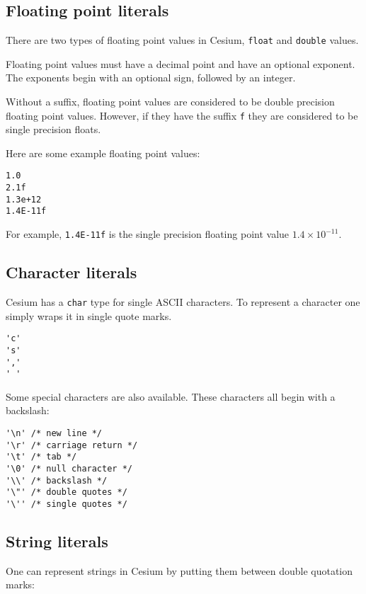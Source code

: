 \documentclass[a4paper,10pt]{article}
\newcommand{\code}{\lstinline}
\begin{document}
\subsection{Floating point literals}

There are two types of floating point values in Cesium, \code{float} and \code{double} values.

Floating point values must have a decimal point and have an optional exponent. The exponents 
begin with an optional sign, followed by an integer. 

Without a suffix, floating point values are considered to be double precision floating point 
values. However, if they have the suffix \code{f} they are considered to be single precision 
floats.

Here are some example floating point values:

\begin{lstlisting}
1.0
2.1f
1.3e+12
1.4E-11f
\end{lstlisting}

For example, \code{1.4E-11f} is the single precision floating point value $1.4\times 10^{-11}$.

\subsection{Character literals}

Cesium has a \code{char} type for single ASCII characters. To represent a character one simply
wraps it in single quote marks.

\begin{lstlisting}
'c'
's'
','
' '
\end{lstlisting}

Some special characters are also available. These characters all begin with a backslash:

\begin{lstlisting}
'\n' /* new line */
'\r' /* carriage return */
'\t' /* tab */
'\0' /* null character */
'\\' /* backslash */
'\"' /* double quotes */
'\'' /* single quotes */
\end{lstlisting}

\subsection{String literals}

One can represent strings in Cesium by putting them between double quotation marks:
\end{document}
